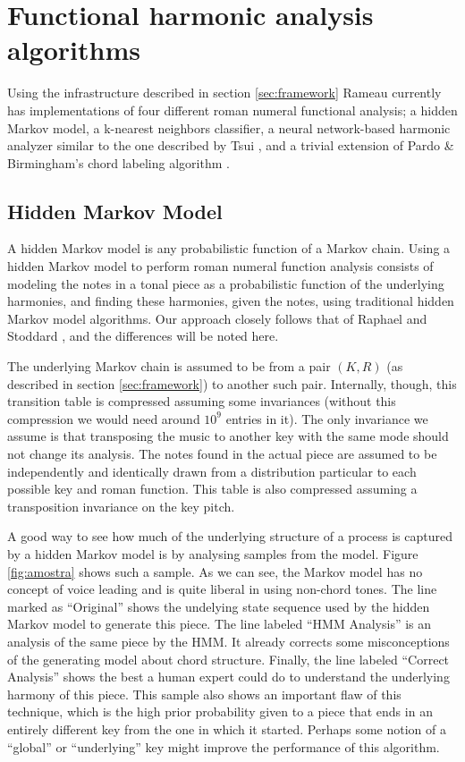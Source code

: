 \section{Functional harmonic analysis algorithms}
\label{sec:algorithms}

Using the infrastructure described in section \ref{sec:framework}
Rameau currently has implementations of four different roman numeral
functional analysis; a hidden Markov model, a k-nearest neighbors
classifier, a neural network-based harmonic analyzer similar to the
one described by Tsui \cite{tsui02:harmonic}, and a trivial extension
of Pardo \& Birmingham's chord labeling algorithm
\cite{pardo.ea99:automated}.

\subsection{Hidden Markov Model}
\label{sec:hidden-markov-model}

A hidden Markov model is any probabilistic function of a Markov
chain. Using a hidden Markov model to perform roman numeral function
analysis consists of modeling the notes in a tonal piece as a
probabilistic function of the underlying harmonies, and finding these
harmonies, given the notes, using traditional hidden Markov model
algorithms. Our approach closely follows that of Raphael and Stoddard
\cite{raphael.ea03:harmonic}, and the differences will be noted here.

The underlying Markov chain is assumed to be from a pair $(K,R)$ (as
described in section \ref{sec:framework}) to another such
pair. Internally, though, this transition table is compressed assuming
some invariances (without this compression we would need around $10^9$
entries in it). The only invariance we assume is that transposing the
music to another key with the same mode should not change its
analysis. The notes found in the actual piece are assumed to be
independently and identically drawn from a distribution particular to
each possible key and roman function. This table is also compressed
assuming a transposition invariance on the key pitch. 

A good way to see how much of the underlying structure of a process is
captured by a hidden Markov model is by analysing samples from the
model. Figure \ref{fig:amostra} shows such a sample. As we can see,
the Markov model has no concept of voice leading and is quite liberal
in using non-chord tones. The line marked as ``Original'' shows the
undelying state sequence used by the hidden Markov model to generate
this piece. The line labeled ``HMM Analysis'' is an analysis of the
same piece by the HMM. It already corrects some misconceptions of the
generating model about chord structure. Finally, the line labeled
``Correct Analysis'' shows the best a human expert could do to
understand the underlying harmony of this piece. This sample also
shows an important flaw of this technique, which is the high prior
probability given to a piece that ends in an entirely different key
from the one in which it started. Perhaps some notion of a ``global''
or ``underlying'' key might improve the performance of this algorithm.

